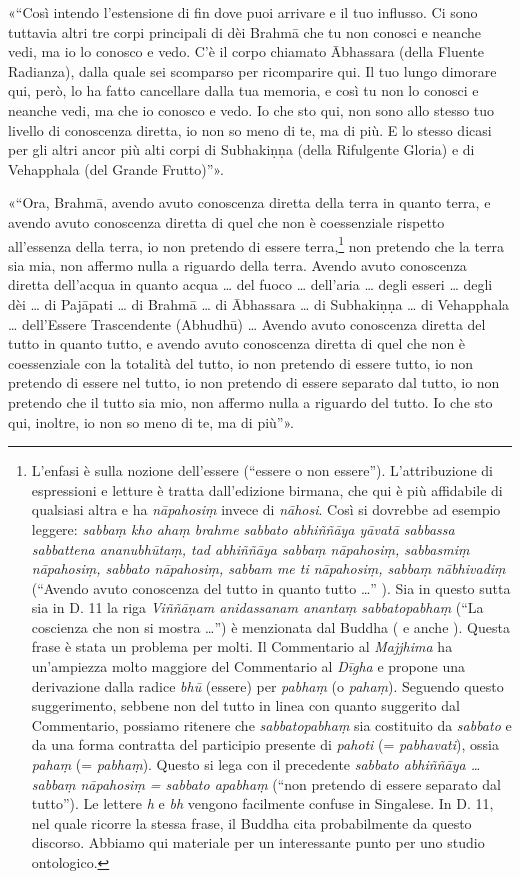«“Così intendo l’estensione di fin dove puoi arrivare e il tuo influsso.
Ci sono tuttavia altri tre corpi principali di dèi Brahmā che tu non
conosci e neanche vedi, ma io lo conosco e vedo. C’è il corpo chiamato
Ābhassara (della Fluente Radianza), dalla quale sei scomparso per
ricomparire qui. Il tuo lungo dimorare qui, però, lo ha fatto cancellare
dalla tua memoria, e così tu non lo conosci e neanche vedi, ma che io
conosco e vedo. Io che sto qui, non sono allo stesso tuo livello di
conoscenza diretta, io non so meno di te, ma di più. E lo stesso dicasi
per gli altri ancor più alti corpi di Subhakiṇṇa (della Rifulgente
Gloria) e di Vehapphala (del Grande Frutto)”».


«“Ora, Brahmā, avendo avuto conoscenza diretta della terra in quanto
terra, e avendo avuto conoscenza diretta di quel che non è coessenziale
rispetto all’essenza della terra, io non pretendo di essere
terra,\footnote{L’enfasi è sulla nozione dell’essere (“essere o non essere”). L’attribuzione di espressioni e letture è tratta dall’edizione birmana, che qui è più affidabile di qualsiasi altra e ha \emph{nāpahosiṃ} invece di \emph{nāhosi}. Così si dovrebbe ad esempio leggere: \emph{sabbaṃ kho ahaṃ brahme sabbato abhiññāya yāvatā sabbassa sabbattena ananubhūtaṃ, tad abhiññāya sabbaṃ nāpahosiṃ, sabbasmiṃ nāpahosiṃ, sabbato nāpahosiṃ, sabbam me ti nāpahosiṃ, sabbaṃ nābhivadiṃ} (“Avendo avuto conoscenza del tutto in quanto tutto …” ). Sia in questo sutta sia in D. 11 la riga \emph{Viññāṇam anidassanam anantaṃ sabbatopabhaṃ} (“La coscienza che non si mostra …”) è menzionata dal Buddha (\hyperlink{pag162}{} e anche \hyperlink{pag167}{}). Questa frase è stata un problema per molti. Il Commentario al \emph{Majjhima} ha un’ampiezza molto maggiore del Commentario al \emph{Dīgha} e propone una derivazione dalla radice \emph{bhū} (essere) per \emph{pabhaṃ} (o \emph{pahaṃ}). Seguendo questo suggerimento, sebbene non del tutto in linea con quanto suggerito dal Commentario, possiamo ritenere che \emph{sabbatopabhaṃ} sia costituito da \emph{sabbato} e da una forma contratta del participio presente di \emph{pahoti} (= \emph{pabhavati}), ossia \emph{pahaṃ} (= \emph{pabhaṃ}). Questo si lega con il precedente \emph{sabbato abhiññāya … sabbaṃ nāpahosiṃ = sabbato apabhaṃ} (“non pretendo di essere separato dal tutto”). Le lettere \emph{h} e \emph{bh} vengono facilmente confuse in Singalese. In D. 11, nel quale ricorre la stessa frase, il Buddha cita probabilmente da questo discorso. Abbiamo qui materiale per un interessante punto per uno studio ontologico.} non pretendo che la terra sia mia, non affermo
nulla a riguardo della terra. Avendo avuto conoscenza diretta dell’acqua
in quanto acqua … del fuoco … dell’aria … degli esseri … degli dèi … di
Pajāpati … di Brahmā … di Ābhassara … di Subhakiṇṇa … di Vehapphala …
dell’Essere Trascendente (Abhudhū) … Avendo avuto conoscenza diretta del
tutto in quanto tutto, e avendo avuto conoscenza diretta di quel che non
è coessenziale con la totalità del tutto, io non pretendo di essere
tutto, io non pretendo di essere nel tutto, io non pretendo di essere
separato dal tutto, io non pretendo che il tutto sia mio, non affermo
nulla a riguardo del tutto. Io che sto qui, inoltre, io non so meno di
te, ma di più”».


